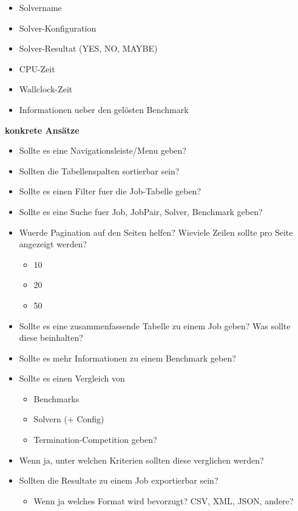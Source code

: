 \begin{itemize}
  \begin{itemize}
  \tightlist
  \item
    Solvername
  \item
    Solver-Konfiguration
  \item
    Solver-Resultat (YES, NO, MAYBE)
  \item
    CPU-Zeit
  \item
    Wallclock-Zeit
  \item
    Informationen ueber den gelösten Benchmark
  \end{itemize}
\end{itemize}

\textbf{konkrete Ansätze}

\begin{itemize}
\item
  Sollte es eine Navigationsleiste/Menu geben?
\item
  Sollten die Tabellenspalten sortierbar sein?
\item
  Sollte es einen Filter fuer die Job-Tabelle geben?
\item
  Sollte es eine Suche fuer Job, JobPair, Solver, Benchmark geben?
\item
  Wuerde Pagination auf den Seiten helfen? Wieviele Zeilen sollte pro
  Seite angezeigt werden?

  \begin{itemize}
  \tightlist
  \item
    10
  \item
    20
  \item
    50
  \end{itemize}
\item
  Sollte es eine zusammenfassende Tabelle zu einem Job geben? Was sollte
  diese beinhalten?
\item
  Sollte es mehr Informationen zu einem Benchmark geben?
\item
  Sollte es einen Vergleich von

  \begin{itemize}
  \tightlist
  \item
    Benchmarks
  \item
    Solvern (+ Config)
  \item
    Termination-Competition geben?
  \end{itemize}
\item
  Wenn ja, unter welchen Kriterien sollten diese verglichen werden?
\item
  Sollten die Resultate zu einem Job exportierbar sein?

  \begin{itemize}
  \tightlist
  \item
    Wenn ja welches Format wird bevorzugt? CSV, XML, JSON, andere?
  \end{itemize}
\end{itemize}

